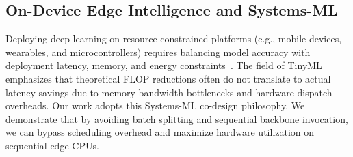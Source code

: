 \subsection{On-Device Edge Intelligence and Systems-ML}
Deploying deep learning on resource-constrained platforms (e.g., mobile devices, wearables, and microcontrollers) requires balancing model accuracy with deployment latency, memory, and energy constraints~\cite{lane2015deep, zhou2019edge}. The field of TinyML~\cite{warden2019tinyml} emphasizes that theoretical FLOP reductions often do not translate to actual latency savings due to memory bandwidth bottlenecks and hardware dispatch overheads. Our work adopts this Systems-ML co-design philosophy. We demonstrate that by avoiding batch splitting and sequential backbone invocation, we can bypass scheduling overhead and maximize hardware utilization on sequential edge CPUs.
